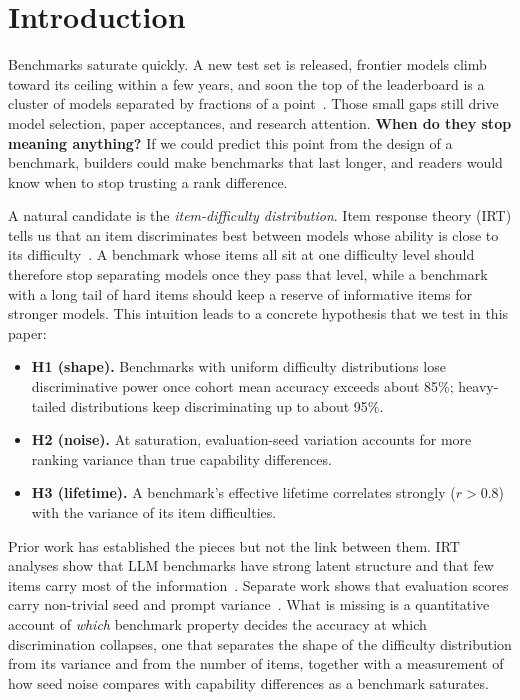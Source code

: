 \section{Introduction}
\label{sec:intro}

Benchmarks saturate quickly. A new test set is released, frontier models climb toward its ceiling within a few years, and soon the top of the leaderboard is a cluster of models separated by fractions of a point~\citep{kiela2021dynabench,ott2022mapping}. Those small gaps still drive model selection, paper acceptances, and research attention. {\bf When do they stop meaning anything?} If we could predict this point from the design of a benchmark, builders could make benchmarks that last longer, and readers would know when to stop trusting a rank difference.

A natural candidate is the {\em item-difficulty distribution}. Item response theory (IRT) tells us that an item discriminates best between models whose ability is close to its difficulty~\citep{lord1980applications,polo2024tinybenchmarks}. A benchmark whose items all sit at one difficulty level should therefore stop separating models once they pass that level, while a benchmark with a long tail of hard items should keep a reserve of informative items for stronger models. This intuition leads to a concrete hypothesis that we test in this paper:
\begin{itemize}[leftmargin=*,itemsep=0pt,topsep=2pt]
    \item {\bf H1 (shape).} Benchmarks with uniform difficulty distributions lose discriminative power once cohort mean accuracy exceeds about 85\%; heavy-tailed distributions keep discriminating up to about 95\%.
    \item {\bf H2 (noise).} At saturation, evaluation-seed variation accounts for more ranking variance than true capability differences.
    \item {\bf H3 (lifetime).} A benchmark's effective lifetime correlates strongly ($r > 0.8$) with the variance of its item difficulties.
\end{itemize}

Prior work has established the pieces but not the link between them. IRT analyses show that LLM benchmarks have strong latent structure and that few items carry most of the information~\citep{polo2024tinybenchmarks,kipnis2024metabench,rodriguez2021evaluation}. Separate work shows that evaluation scores carry non-trivial seed and prompt variance~\citep{madaan2024quantifying,miller2024adding,zheng2024large}. What is missing is a quantitative account of {\em which} benchmark property decides the accuracy at which discrimination collapses, one that separates the shape of the difficulty distribution from its variance and from the number of items, together with a measurement of how seed noise compares with capability differences as a benchmark saturates.

